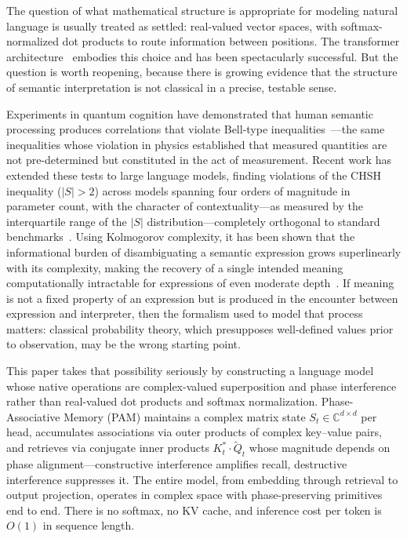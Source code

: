 \documentclass[11pt]{article}
\newcommand{\Complex}{\mathbb{C}}
\begin{document}
The question of what mathematical structure is appropriate for modeling natural language is usually treated as settled: real-valued vector spaces, with softmax-normalized dot products to route information between positions. The transformer architecture~\cite{vaswani2017attention} embodies this choice and has been spectacularly successful. But the question is worth reopening, because there is growing evidence that the structure of semantic interpretation is not classical in a precise, testable sense.

Experiments in quantum cognition have demonstrated that human semantic processing produces correlations that violate Bell-type inequalities~\cite{busemeyer2012quantum,bruza2023contextuality}---the same inequalities whose violation in physics established that measured quantities are not pre-determined but constituted in the act of measurement. Recent work has extended these tests to large language models, finding violations of the CHSH inequality ($|S| > 2$) across models spanning four orders of magnitude in parameter count, with the character of contextuality---as measured by the interquartile range of the $|S|$ distribution---completely orthogonal to standard benchmarks~\cite{agostino2025quantum,agostino2026production}. Using Kolmogorov complexity, it has been shown that the informational burden of disambiguating a semantic expression grows superlinearly with its complexity, making the recovery of a single intended meaning computationally intractable for expressions of even moderate depth~\cite{agostino2025quantum}. If meaning is not a fixed property of an expression but is produced in the encounter between expression and interpreter, then the formalism used to model that process matters: classical probability theory, which presupposes well-defined values prior to observation, may be the wrong starting point.

This paper takes that possibility seriously by constructing a language model whose native operations are complex-valued superposition and phase interference rather than real-valued dot products and softmax normalization. Phase-Associative Memory (PAM) maintains a complex matrix state $S_t \in \Complex^{d \times d}$ per head, accumulates associations via outer products of complex key--value pairs, and retrieves via conjugate inner products $K_t^* \cdot \tilde{Q}_t$ whose magnitude depends on phase alignment---constructive interference amplifies recall, destructive interference suppresses it. The entire model, from embedding through retrieval to output projection, operates in complex space with phase-preserving primitives end to end. There is no softmax, no KV cache, and inference cost per token is $O(1)$ in sequence length.
\end{document}
